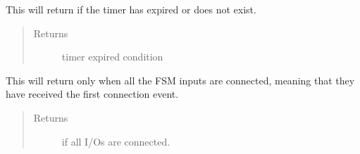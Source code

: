 \documentclass[letterpaper,10pt,english]{sphinxmanual}
\begin{document}

\begin{fulllineitems}
\label{\detokenize{fsm:tmrExp}}
This will return  if the timer has expired or does not exist.
\begin{quote}\begin{description}
\item[{Returns}] \leavevmode
timer expired condition

\end{description}\end{quote}

\end{fulllineitems}


\begin{fulllineitems}
\label{\detokenize{fsm:isIoConnected}}
This will return  only when all the FSM inputs are connected,
meaning that they have received the first connection event.
\begin{quote}\begin{description}
\item[{Returns}] \leavevmode
{} if all I/Os are connected.

\end{description}\end{quote}

\end{fulllineitems}

\end{document}
